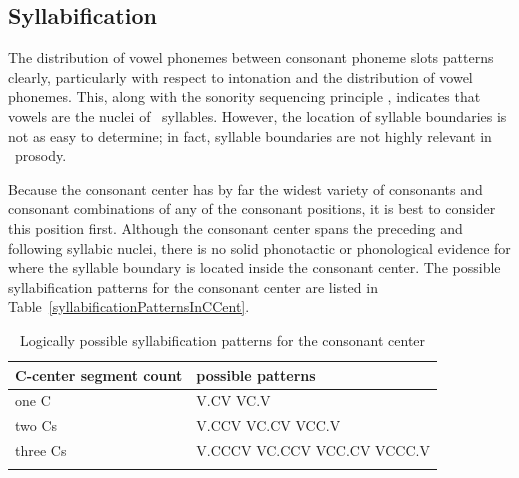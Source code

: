 \FB


\subsection{Syllabification}\label{syllabification}
The distribution of vowel phonemes between consonant phoneme slots patterns clearly, particularly with respect to intonation and the distribution of vowel phonemes. 
This, along with the sonority sequencing principle \citep[cf.~e.g.,~][]{Selkirk1984}, indicates that vowels are the nuclei of \PS\ syllables.  
However, the location of syllable boundaries is not as easy to determine; in fact, syllable boundaries are not highly relevant in \PS\ prosody. 

Because the consonant center has by far the widest variety of consonants and consonant combinations of any of the consonant positions, it is best to consider this position first. 
Although the consonant center spans the preceding and following syllabic nuclei, there is no solid phonotactic or phonological evidence for where the syllable boundary is located inside the consonant center. 
The possible syllabification patterns for the consonant center are listed in Table~\vref{syllabificationPatternsInCCent}. 
\newcommand{\HSP}{\hspace*{4pt}}%
\begin{table}[ht]\centering
\caption{Logically possible syllabification patterns for the consonant center}\label{syllabificationPatternsInCCent}
\begin{tabular}{ll}\mytoprule%
{C-center segment count}	&{possible patterns} \\\hline
one C	& V.CV \HSP VC.V \\%
two Cs	& V.CCV \HSP VC.CV \HSP VCC.V \\
three Cs	& V.CCCV \HSP VC.CCV \HSP VCC.CV \HSP VCCC.V \\\mybottomrule
\end{tabular}
\end{table}

